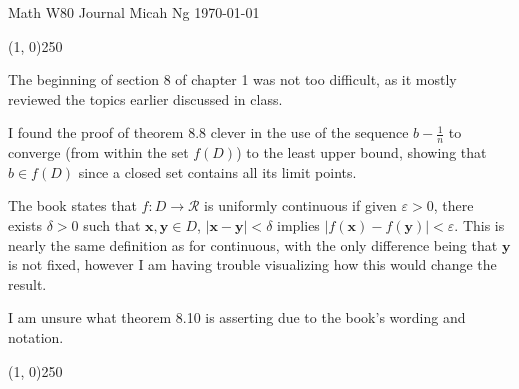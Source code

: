 \documentclass[11pt,letterpaper]{article}
\begin{document}
\noindent
Math W80 Journal \hfill Micah Ng \hfill \today

\begin{center}
\line(1, 0){250}
\end{center}

The beginning of section 8 of chapter 1 was not too difficult, as it mostly
reviewed the topics earlier discussed in class.

I found the proof of theorem 8.8 clever in the use of the sequence
$b-\frac{1}{n}$ to converge (from within the set $f(D)$) to the least upper
bound, showing that $b\in f(D)$ since a closed set contains all its limit
points.

The book states that $f:D\to\mathscr{R}$ is uniformly continuous if given
$\varepsilon>0$, there exists $\delta>0$ such that
$\mathbf{x},\mathbf{y}\in D$, $|\mathbf{x}-\mathbf{y}|<\delta$ implies
$|f(\mathbf{x})-f(\mathbf{y})|<\varepsilon$. This is nearly the same definition
as for continuous, with the only difference being that $\mathbf{y}$ is not
fixed, however I am having trouble visualizing how this would change the
result.

I am unsure what theorem 8.10 is asserting due to the book's wording and
notation.

\begin{center}
\line(1, 0){250}
\end{center}
\end{document}
